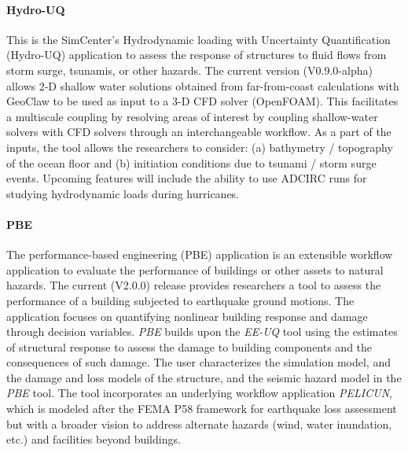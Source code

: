 \paragraph{Hydro-UQ} This is the SimCenter's Hydrodynamic loading with Uncertainty Quantification (Hydro-UQ) application to assess the response of structures to fluid flows from storm surge, tsunamis, or other hazards. The current version (V0.9.0-alpha) allows 2-D shallow water solutions obtained from far-from-coast calculations with GeoClaw  to be used as input to a 3-D CFD solver (OpenFOAM). This facilitates a multiscale coupling by resolving areas of interest by coupling shallow-water solvers with CFD solvers through an interchangeable workflow. As a part of the inputs, the tool allows the researchers to consider: (a) bathymetry / topography of the ocean floor and (b) initiation conditions due to tsunami / storm surge events. Upcoming features will include the ability to use ADCIRC runs for studying hydrodynamic loads during hurricanes.

\paragraph{PBE} The performance-based engineering (PBE) application is an extensible workflow application to evaluate the performance of buildings or other assets to natural hazards. The current (V2.0.0) release provides researchers a tool to assess the performance of a building subjected to earthquake ground motions. The application focuses on quantifying nonlinear building response and damage through decision variables. \emph{PBE} builds upon the \emph{EE-UQ} tool using the estimates of structural response to assess the damage to building components and the consequences of such damage. The user characterizes the simulation model, and the damage and loss models of the structure, and the seismic hazard model in the \emph{PBE} tool. The tool incorporates an underlying workflow application \emph{PELICUN}, which is modeled after the FEMA P58 framework for earthquake loss assessment but with a broader vision to address alternate hazards (wind, water inundation, etc.) and facilities beyond buildings. 

